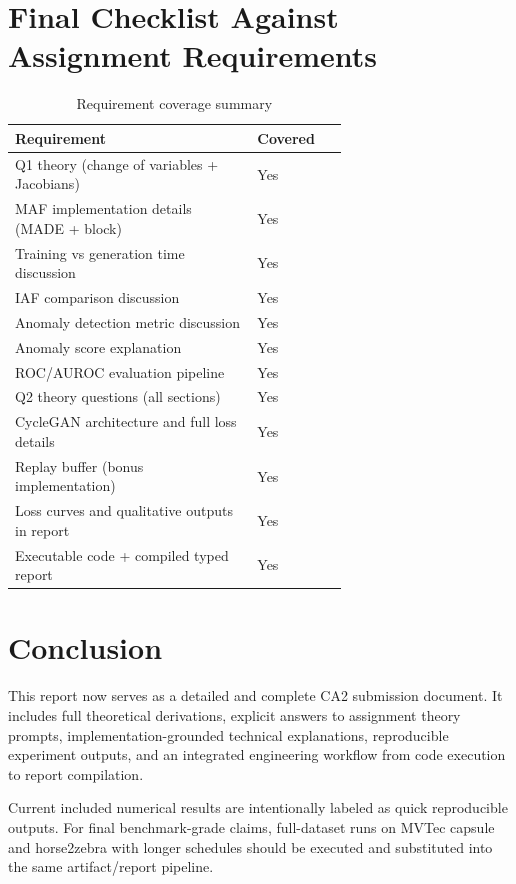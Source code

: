 \documentclass[conference]{IEEEtran}
\begin{document}
\section{Final Checklist Against Assignment Requirements}
\begin{table}[!t]
\centering
\caption{Requirement coverage summary}
\begin{tabular}{>{\raggedright}p{0.52\linewidth} >{\centering\arraybackslash}p{0.14\linewidth}}
\toprule
Requirement & Covered \\
\midrule
Q1 theory (change of variables + Jacobians) & Yes \\
MAF implementation details (MADE + block) & Yes \\
Training vs generation time discussion & Yes \\
IAF comparison discussion & Yes \\
Anomaly detection metric discussion & Yes \\
Anomaly score explanation & Yes \\
ROC/AUROC evaluation pipeline & Yes \\
Q2 theory questions (all sections) & Yes \\
CycleGAN architecture and full loss details & Yes \\
Replay buffer (bonus implementation) & Yes \\
Loss curves and qualitative outputs in report & Yes \\
Executable code + compiled typed report & Yes \\
\bottomrule
\end{tabular}
\label{tab:coverage}
\end{table}

\section{Conclusion}
This report now serves as a detailed and complete CA2 submission document. It includes full theoretical derivations, explicit answers to assignment theory prompts, implementation-grounded technical explanations, reproducible experiment outputs, and an integrated engineering workflow from code execution to report compilation.

Current included numerical results are intentionally labeled as quick reproducible outputs. For final benchmark-grade claims, full-dataset runs on MVTec capsule and horse2zebra with longer schedules should be executed and substituted into the same artifact/report pipeline.
\end{document}

